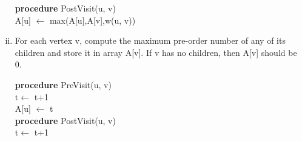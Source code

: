 \documentclass[11pt]{article}
\begin{document}
\begin{subparts}
\begin{enumerate}[i.]
\begin{solution}
            \textbf{procedure} PostVisit(u, v) \\
            \quad A[u] $\leftarrow$ max(A[u],A[v],w(u, v))
        \end{solution}

        \item For each vertex v, compute the maximum pre-order number of any of its children and store it in array A[v]. If v has no children, then A[v] should be 0. \par
        \begin{solution} \par
            \textbf{procedure} PreVisit(u, v) \\
            \quad t$\leftarrow$ t+1 \\
            \quad A[u] $\leftarrow$ t \\
            
            \textbf{procedure} PostVisit(u, v) \\
            \quad t$\leftarrow$ t+1 \\
        \end{solution} 
    \end{enumerate}
\end{subparts}
\end{document}
